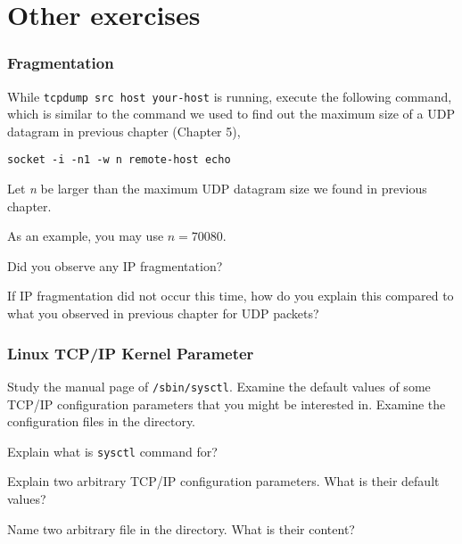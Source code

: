 \documentclass{../UTNetLab}
\begin{document}
\part{Other exercises}
\section{Fragmentation}
    While \lstinline[emph={your-host, remote-host}]{tcpdump src host your-host} is running, execute the following command, which is similar to the command we used to find out the maximum size of a UDP datagram in previous chapter (Chapter 5),
    \begin{lstlisting}[emph={n, remote-host}]
socket -i -n1 -w n remote-host echo
    \end{lstlisting}
    Let \textit{n} be larger than the maximum UDP datagram size we found in previous chapter.

    As an example, you may use $n = 70080$.

    \begin{report}
    \item Did you observe any IP fragmentation?
        
    \item If IP fragmentation did not occur this time, how do you explain this compared to what you observed in previous chapter for UDP packets?
    \end{report}

\section{Linux TCP/IP Kernel Parameter}
    Study the manual page of \lstinline{/sbin/sysctl}.
    Examine the default values of some TCP/IP configuration parameters that you might be interested in.
    Examine the configuration files in the  directory.

    \begin{report}
    \item Explain what is \lstinline{sysctl} command for?
        
    \item Explain two arbitrary TCP/IP configuration parameters. What is their default values?
        
    \item Name two arbitrary file in the  directory. What is their content?
    \end{report}
\end{document}
